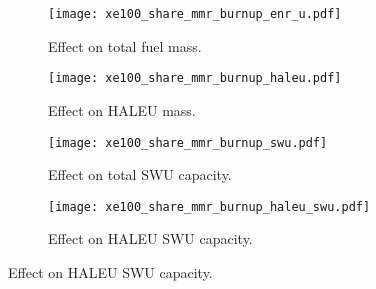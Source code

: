 \begin{figure}
    \begin{subfigure}[b]{0.48\textwidth}
        \centering
        \texttt{[image: xe100\_share\_mmr\_burnup\_enr\_u.pdf]}
        \caption{Effect on total fuel mass.}
        \label{fig:xe100_share_mmr_burnup_enr_u}
    \end{subfigure}
    \hfill
    \begin{subfigure}[b]{0.48\textwidth}
        \centering
        \texttt{[image: xe100\_share\_mmr\_burnup\_haleu.pdf]}
        \caption{Effect on HALEU mass.}
        \label{fig:xe100_share_mmr_burnup_haleu}
    \end{subfigure}
    
    \begin{subfigure}[b]{0.48\textwidth}
        \centering
        \texttt{[image: xe100\_share\_mmr\_burnup\_swu.pdf]}
        \caption{Effect on total SWU capacity.}
        \label{fig:xe100_share_mmr_burnup_swu}
    \end{subfigure}
    \hfill
    \begin{subfigure}[b]{0.48\textwidth}
        \centering
        \texttt{[image: xe100\_share\_mmr\_burnup\_haleu\_swu.pdf]}
        \caption{Effect on HALEU SWU capacity.}
        \label{fig:xe100_share_mmr_burnup_haleu_swu}
    \end{subfigure}    
\end{figure}

